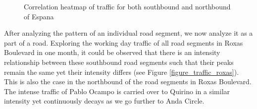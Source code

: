 \begin{figure}[!t] 
\centering
    \centering
      \captionsetup{justification=centering}
    \hfill
    \caption{Correlation heatmap of traffic for both southbound and northbound of Espana}

    \label{figure_traffic_espana_corr}
\end{figure}


After analyzing the pattern of an individual road segment, we now analyze it as a part of a road. Exploring the working day traffic of all road segments in Roxas Boulevard in one month, it could be observed that there is an intensity relationship between these southbound road segments such that their peaks remain the same yet their intensity differs (see Figure \ref{figure_traffic_roxas}). This is also the case in the northbound of the road segments in Roxas Boulevard. The intense traffic of Pablo Ocampo is carried over to Quirino in a similar intensity yet continuously decays as we go further to Anda Circle.

